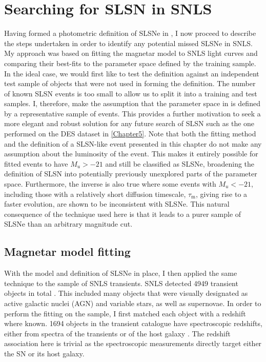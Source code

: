 \section{Searching for SLSN in SNLS}
Having formed a photometric definition of SLSNe in , I now proceed to describe the steps undertaken in order to identify any potential missed SLSNe in SNLS. My approach was based on fitting the magnetar model to SNLS light curves and comparing their best-fits to the parameter space defined by the training sample. In the ideal case, we would first like to test the definition against an independent test sample of objects that were not used in forming the definition. The number of known SLSN events is too small to allow us to split it into a training and test samples. I, therefore, make the assumption that the parameter space in  is defined by a representative sample of events. This provides a further motivation to seek a more elegant and robust solution for any future search of SLSN such as the one performed on the DES dataset in \cref{Chapter5}. Note that both the fitting method and the definition of a SLSN-like event presented in this chapter do not make any assumption about the luminosity of the event. This makes it entirely possible for fitted events to have $M_u>-21$ and still be classified as SLSNe, broadening the definition of SLSN into potentially previously unexplored parts of the parameter space. Furthermore, the inverse is also true where some events with $M_u<-21$, including those with a relatively short diffusion timescale, $\tau_\mathrm{m}$, giving rise to a faster evolution, are shown to be inconsistent with SLSNe. This natural consequence of the technique used here is that it leads to a purer sample of SLSNe than an arbitrary magnitude cut.

\subsection{Magnetar model fitting}
With the model and definition of SLSNe in place, I then applied the same technique to the sample of SNLS transients. SNLS detected 4949 transient objects in total \citep{Perrett2010}. This included many objects that were visually designated as active galactic nuclei (AGN) and variable stars, as well as supernovae. In order to perform the fitting on the sample, I first matched each object with a redshift where known. 1694 objects in the transient catalogue have spectroscopic redshifts, either from spectra of the transients or of the host galaxy \citep{Perrett2012}. The redshift association here is trivial as the spectroscopic measurements directly target either the SN or its host galaxy.

